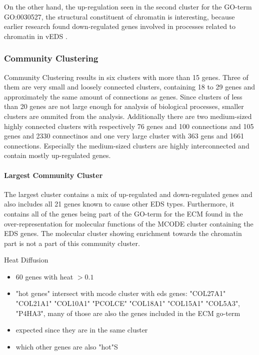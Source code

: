 On the other hand, the up-regulation seen in the second cluster for the GO-term GO:0030527, the structural constituent of chromatin is interesting, because earlier research found down-regulated genes involved in processes related to chromatin in vEDS \cite{Chiarelli2018}.


\subsubsection{Community Clustering}

Community Clustering results in six clusters with more than 15 genes. Three of them are very small and loosely connected clusters, containing 18 to 29 genes and approximately the same amount of connections as genes. Since clusters of less than 20 genes are not large enough for analysis of biological processes, smaller clusters are ommited from the analysis. Additionally there are two medium-sized highly connected clusters with respectively 76 genes and 100 connections and 105 genes and 2330 connectinos and one very large cluster with 363 gens and 1661 connections. Especially the medium-sized clusters are highly interconnected and contain mostly up-regulated genes.

\paragraph{Largest Community Cluster}

The largest cluster contains a mix of up-regulated and down-regulated genes and also includes all 21 genes known to cause other EDS types. Furthermore, it contains all of the genes being part of the GO-term for the ECM found in the over-representation for molecular functions of the MCODE cluster containing the EDS genes. The molecular cluster showing enrichment towards the chromatin part is not a part of this community cluster.

Heat Diffusion 

\begin{itemize}
	\item 60 genes with heat $> 0.1$
	\item "hot genes" intersect with mcode cluster with eds genes: "COL27A1" "COL21A1" "COL10A1" "PCOLCE"  "COL18A1" "COL15A1" "COL5A3", "P4HA3", many of those are also the genes included in the ECM go-term
	\item expected since they are in the same cluster
	\item which other genes are also "hot"S
\end{itemize}





